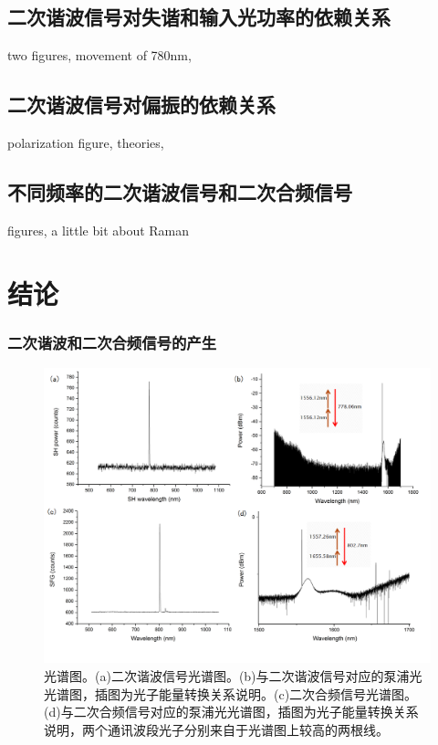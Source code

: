 \documentclass[UTF8,a4paper,cs4size,hyperref]{ctexart}
\begin{document}
\subsection{二次谐波信号对失谐和输入光功率的依赖关系}

two figures, movement of 780nm, 

\subsection{二次谐波信号对偏振的依赖关系}

polarization figure, theories, 

\subsection{不同频率的二次谐波信号和二次合频信号}

figures, a little bit about Raman

\section{结论}













\subsubsection{二次谐波和二次合频信号的产生}

\begin{figure}
\centering
\includegraphics[width=14cm ]{Spectrum.png}
\caption{光谱图。(a)二次谐波信号光谱图。(b)与二次谐波信号对应的泵浦光光谱图，插图为光子能量转换关系说明。(c)二次合频信号光谱图。(d)与二次合频信号对应的泵浦光光谱图，插图为光子能量转换关系说明，两个通讯波段光子分别来自于光谱图上较高的两根线。}
\label{pic:Spectrum}
\end{figure}
\end{document}
